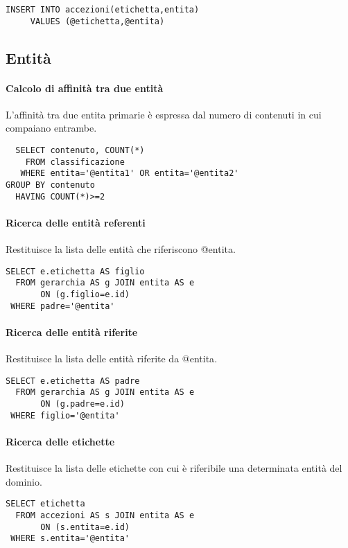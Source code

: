 \begin{verbatim}
INSERT INTO accezioni(etichetta,entita)
     VALUES (@etichetta,@entita)
\end{verbatim}
	
\subsection*{Entità}
	
\paragraph{Calcolo di affinità tra due entità}
L'affinità tra due entita primarie è espressa dal numero di contenuti in cui compaiano entrambe.
\begin{verbatim}
  SELECT contenuto, COUNT(*)
    FROM classificazione
   WHERE entita='@entita1' OR entita='@entita2'
GROUP BY contenuto
  HAVING COUNT(*)>=2
\end{verbatim}

\paragraph{Ricerca delle entità referenti}
Restituisce la lista delle entità che riferiscono \textsf{@entita}.
\begin{verbatim}
SELECT e.etichetta AS figlio
  FROM gerarchia AS g JOIN entita AS e
       ON (g.figlio=e.id)
 WHERE padre='@entita'
\end{verbatim}

\paragraph{Ricerca delle entità riferite}
Restituisce la lista delle entità riferite da \textsf{@entita}.
\begin{verbatim}
SELECT e.etichetta AS padre
  FROM gerarchia AS g JOIN entita AS e
       ON (g.padre=e.id)
 WHERE figlio='@entita'
\end{verbatim}

\paragraph{Ricerca delle etichette}
Restituisce la lista delle etichette con cui è riferibile una determinata entità del dominio.
\begin{verbatim}
SELECT etichetta
  FROM accezioni AS s JOIN entita AS e
       ON (s.entita=e.id)
 WHERE s.entita='@entita'
\end{verbatim}

